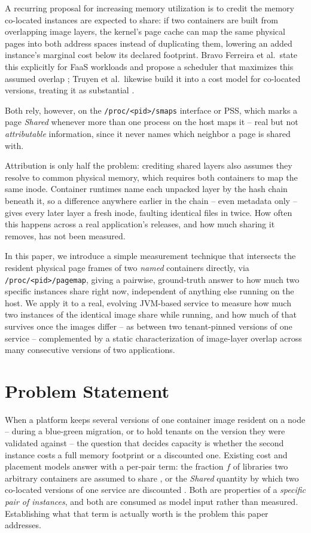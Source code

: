 \documentclass[sigplan,10pt,natbib=false]{acmart}
\newcommand{\procpath}[1]{\texttt{/proc/\allowbreak<pid>/\allowbreak#1}}
\begin{document}
A recurring proposal for increasing memory utilization is to credit
the memory co-located instances are expected to share: if two
containers are built from overlapping image layers, the kernel's page
cache can map the same physical pages into both address spaces instead
of duplicating them, lowering an added instance's marginal cost below
its declared footprint. Bravo Ferreira et al.\ state this
explicitly for FaaS workloads and propose a scheduler that maximizes
this assumed overlap \cite{bravo2017more}; Truyen et al.\ likewise
build it into a cost model for co-located versions, treating it as
substantial \cite{truyen2020flexible}.

Both rely, however, on the \procpath{smaps} interface or PSS, which
marks a page \emph{Shared} whenever more than one process on the host
maps it -- real but not \emph{attributable} information, since it
never names which neighbor a page is shared with.

Attribution is only half the problem: crediting shared layers also
assumes they resolve to common physical memory, which requires both
containers to map the same inode. Container runtimes name each
unpacked layer by the hash chain beneath it, so a difference anywhere
earlier in the chain -- even metadata only -- gives every later layer
a fresh inode, faulting identical files in twice. How often this
happens across a real application's releases, and how much sharing it
removes, has not been measured.

In this paper, we introduce a simple measurement technique that
intersects the resident physical page frames of two \emph{named}
containers directly, via \procpath{pagemap}, giving a pairwise,
ground-truth answer to how much two specific instances share right
now, independent of anything else running on the host. We apply it to
a real, evolving JVM-based service to measure how much two instances of
the identical image share while running, and how much of that survives
once the images differ -- as between two tenant-pinned versions of one
service -- complemented by a static characterization of image-layer
overlap across many consecutive versions of two applications.

\section{Problem Statement}
\label{sec:background}

When a platform keeps several versions of one container image resident
on a node -- during a blue-green migration, or to hold tenants on the
version they were validated against -- the question that decides
capacity is whether the second instance costs a full memory footprint
or a discounted one. Existing cost and placement models answer with a
per-pair term: the fraction $f$ of libraries two arbitrary containers
are assumed to share \cite{bravo2017more}, or the \emph{Shared}
quantity by which two co-located versions of one service are
discounted \cite{truyen2020flexible}. Both are properties of a
\emph{specific pair of instances}, and both are consumed as model
input rather than measured. Establishing what that term is actually
worth is the problem this paper addresses.
\end{document}
